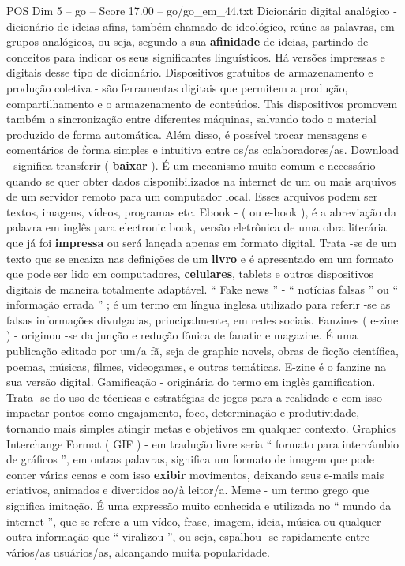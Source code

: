 \begin{textsample}{POS Dim 5 – go – Score 17.00 – go/go\_em\_44.txt}
Dicionário digital analógico - dicionário de ideias afins, também chamado de ideológico, reúne as palavras, em grupos analógicos, ou seja, segundo a sua \textbf{afinidade} de ideias, partindo de conceitos para indicar os seus significantes linguísticos.
Há versões impressas e digitais desse tipo de dicionário.
Dispositivos gratuitos de armazenamento e produção coletiva - são ferramentas digitais que permitem a produção, compartilhamento e o armazenamento de conteúdos.
Tais dispositivos promovem também a sincronização entre diferentes máquinas, salvando todo o material produzido de forma automática.
Além disso, é possível trocar mensagens e comentários de forma simples e intuitiva entre os/as colaboradores/as.
Download - significa transferir ( \textbf{baixar} ).
É um mecanismo muito comum e necessário quando se quer obter dados disponibilizados na internet de um ou mais arquivos de um servidor remoto para um computador local.
Esses arquivos podem ser textos, imagens, vídeos, programas etc.
Ebook - ( ou e-book ), é a abreviação da palavra em inglês para electronic book, versão eletrônica de uma obra literária que já foi \textbf{impressa} ou será lançada apenas em formato digital.
Trata -se de um texto que se encaixa nas definições de um \textbf{livro} e é apresentado em um formato que pode ser lido em computadores, \textbf{celulares}, tablets e outros dispositivos digitais de maneira totalmente adaptável. “ Fake news ” - “ notícias falsas ” ou “ informação errada ” ; é um termo em língua inglesa utilizado para referir -se as falsas informações divulgadas, principalmente, em redes sociais.
Fanzines ( e-zine ) - originou -se da junção e redução fônica de fanatic e magazine.
É uma publicação editado por um/a fã, seja de graphic novels, obras de ficção científica, poemas, músicas, filmes, videogames, e outras temáticas.
E-zine é o fanzine na sua versão digital.
Gamificação - originária do termo em inglês gamification.
Trata -se do uso de técnicas e estratégias de jogos para a realidade e com isso impactar pontos como engajamento, foco, determinação e produtividade, tornando mais simples atingir metas e objetivos em qualquer contexto.
Graphics Interchange Format ( GIF ) - em tradução livre seria “ formato para intercâmbio de gráficos ”, em outras palavras, significa um formato de imagem que pode conter várias cenas e com isso \textbf{exibir} movimentos, deixando seus e-mails mais criativos, animados e divertidos ao/à leitor/a.
Meme - um termo grego que significa imitação.
É uma expressão muito conhecida e utilizada no “ mundo da internet ”, que se refere a um vídeo, frase, imagem, ideia, música ou qualquer outra informação que “ viralizou ”, ou seja, espalhou -se rapidamente entre vários/as usuários/as, alcançando muita popularidade.

\end{textsample}
